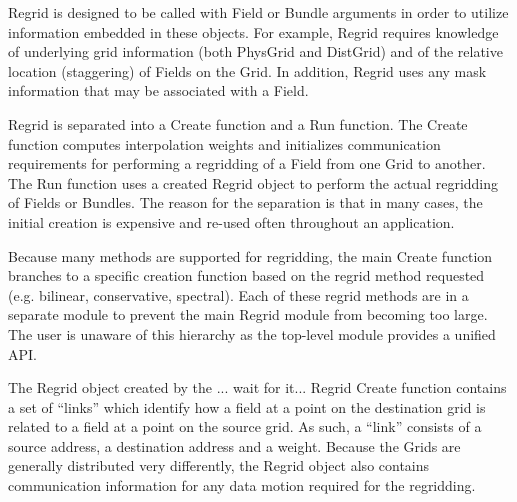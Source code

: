 



Regrid is designed to be called with Field or Bundle
arguments in order to utilize information embedded in
these objects.  For example, Regrid requires knowledge
of underlying grid information (both PhysGrid and DistGrid)
and of the relative location (staggering) of Fields on
the Grid.  In addition, Regrid uses any mask information
that may be associated with a Field.

Regrid is separated into a Create function and a
Run function. The Create function computes
interpolation weights and initializes communication
requirements for performing a regridding of a Field
from one Grid to another.  The Run function uses
a created Regrid object to perform the actual regridding
of Fields or Bundles.  The reason for the separation
is that in many cases, the initial creation is
expensive and re-used often throughout an application.

Because many methods are supported for regridding,
the main Create function branches to a specific
creation function based on the regrid method requested
(e.g. bilinear, conservative, spectral).  Each of
these regrid methods are in a separate module to
prevent the main Regrid module from becoming too
large.  The user is unaware of this hierarchy as the
top-level module provides a unified API.

The Regrid object created by the ... wait for it...
Regrid Create function contains a set of ``links''
which identify how a field at a point on the
destination grid is related to a field at a
point on the source grid.  As such, a ``link''
consists of a source address, a destination address
and a weight.  Because the Grids are generally
distributed very differently, the Regrid object
also contains communication information
for any data motion required for the regridding.

